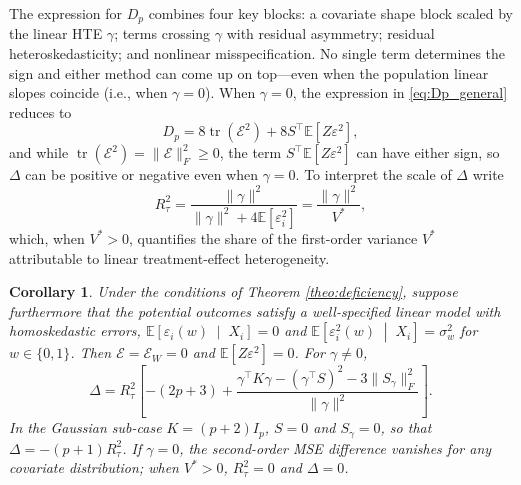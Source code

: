 \documentclass{article}
\newcommand{\EEE}{\mathbb{E}}
\newcommand{\EE}[1]{\mathbb{E}\left[#1\right]}
\newcommand{\Var}[1]{\operatorname{Var}\left[#1\right]}
\newcommand{\cond}{\;\middle|\;}
\DeclareMathOperator{\tr}{tr}
\theoremstyle{plain}
\newtheorem{coro}[prop]{Corollary}
\theoremstyle{definition}
\theoremstyle{remark}
\begin{document}
The expression for $D_p$ combines four key blocks: a covariate shape block scaled by the linear HTE $\gamma$; terms crossing $\gamma$ with residual asymmetry; residual heteroskedasticity; and nonlinear misspecification. No single term determines the sign and either method can come up on top---even when the population linear slopes coincide (i.e., when $\gamma = 0$). When $\gamma = 0$, the expression in \eqref{eq:Dp_general} reduces to
\[
D_p=8\tr(\mathcal E^2)+8S^\top \EEE[Z\varepsilon^2],
\]
and while $\tr(\mathcal E^2) = \|\mathcal E\|_F^2 \geq 0$, the term $S^\top \EEE[Z\varepsilon^2]$ can have either sign, so $\Delta$ can be positive or negative even when $\gamma = 0$.
To interpret the scale of $\Delta$ write
\[
R^2_\tau
=
\frac{\|\gamma\|^2}{\|\gamma\|^2+4\EEE[\varepsilon_i^2]}
= \frac{\|\gamma\|^2}{V^*},
\]
which, when $V^*>0$, quantifies the share of the first-order variance $V^*$ attributable to linear treatment-effect heterogeneity.

\begin{coro}
\label{coro:homosk}
Under the conditions of Theorem \ref{theo:deficiency}, suppose furthermore that the potential outcomes satisfy a well-specified linear model with homoskedastic errors, $\EE{\varepsilon_i(w)\cond X_i}=0$ and $\EE{\varepsilon_i^2(w)\cond X_i}=\sigma_w^2$ for $w\in\{0,1\}$. Then $\mathcal E = \mathcal E_W = 0$ and $\EEE[Z\varepsilon^2]=0$. For $\gamma\neq0$,
\begin{equation}
\label{eq:homosk_deficiency}
\Delta
=
R_\tau^2
\left[
-(2p+3)
+
\frac{\gamma^\top K\gamma-(\gamma^\top S)^2-3\|S_\gamma\|_F^2}{\|\gamma\|^2}
\right].
\end{equation}
In the Gaussian sub-case $K = (p+2)I_p$, $S=0$ and $S_\gamma = 0$, so that $\Delta = -(p+1)R_\tau^2$.
If $\gamma=0$, the second-order MSE difference vanishes for any covariate distribution; when $V^*>0$, $R_\tau^2=0$ and $\Delta=0$.
\end{coro}
\end{document}
